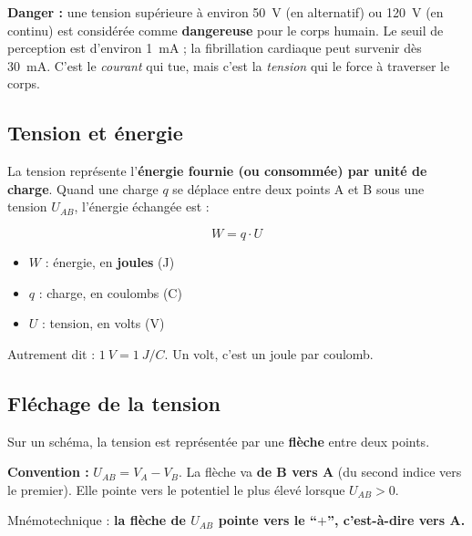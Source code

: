 \documentclass[12pt,a4paper,twoside]{book}
\begin{document}
\begin{attention}
\textbf{Danger :} une tension supérieure à environ \SI{50}{V} (en alternatif) ou \SI{120}{V} (en continu) est considérée comme \textbf{dangereuse} pour le corps humain. Le seuil de perception est d'environ \SI{1}{mA} ; la fibrillation cardiaque peut survenir dès \SI{30}{mA}. C'est le \textit{courant} qui tue, mais c'est la \textit{tension} qui le force à traverser le corps.
\end{attention}

\subsection{Tension et énergie}

La tension représente l'\textbf{énergie fournie (ou consommée) par unité de charge}. Quand une charge $q$ se déplace entre deux points A et B sous une tension $U_{AB}$, l'énergie échangée est :

\begin{formule}
\[
\boxed{W = q \cdot U}
\]
\begin{itemize}[nosep]
\item $W$ : énergie, en \textbf{joules} (J)
\item $q$ : charge, en coulombs (C)
\item $U$ : tension, en volts (V)
\end{itemize}
\vspace{0.2cm}
Autrement dit : $\SI{1}{V} = \SI{1}{J/C}$. Un volt, c'est un joule par coulomb.
\end{formule}

\subsection{Fléchage de la tension}

Sur un schéma, la tension est représentée par une \textbf{flèche} entre deux points.

\textbf{Convention :} $U_{AB} = V_A - V_B$. La flèche va \textbf{de B vers A} (du second indice vers le premier). Elle pointe vers le potentiel le plus élevé lorsque $U_{AB} > 0$.

Mnémotechnique : \textbf{la flèche de $U_{AB}$ pointe vers le ``$+$'', c'est-à-dire vers A.}
\end{document}
